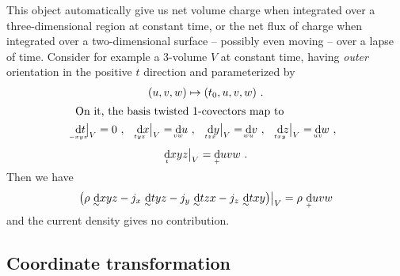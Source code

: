 \documentclass[\ifafour a4paper,12pt,\else a5paper,10pt,\fi%
onecolumn,oneside,article,%
british%
]{memoir}
\theoremstyle{remark}
\theoremstyle{innote}
\newcommand*{\di}{\mathrm{d}}%
\renewcommand*{\|}[1][]{\nonscript\:#1\vert\nonscript\:\mathopen{}}
\newcommand*{\tw}[2][\scriptstyle\sim]{\smash[b]{\underset{\mathclap{{}^{#1}}}{#2}}}
\newcommand*{\ti}[1][\scriptstyle\sim]{\tw[#1]{\di}}
\begin{document}
This object automatically give us net volume charge when integrated over a three-dimensional region at constant time, or the net flux of charge when integrated over a two-dimensional surface -- possibly even moving -- over a lapse of time. Consider for example a 3-volume $V$ at constant time, having \emph{outer} orientation in the positive $t$ direction and parameterized by
\begin{gather}
  \label{eq:3-volume_space}
  (u, v, w) \mapsto (t_{0}, u, v, w) \ .
\\
  \shortintertext{On it, the basis twisted 1-covectors map to}
  \begin{gathered}
  \ti[-xyz] t\bigr\rvert_{V} = 0\ , \quad
  \ti[tyz] x\bigr\rvert_{V} = \ti[vw] u\ , \quad
  \ti[tzx] y\bigr\rvert_{V} = \ti[wu] v\ , \quad
  \ti[txy] z\bigr\rvert_{V} = \ti[uv] w\ ,
  \\[2\jot]
  \ti[t]xyz\bigr\rvert_{V} = \ti[+]uvw \ .
\end{gathered}
\end{gather}
Then we have
\begin{equation}
  \label{eq:charge-current_on_3volume}
  \bigl(\rho\ \ti xyz
  - j_{x}\ \ti tyz - j_{y}\ \ti tzx - j_{z}\ \ti txy \bigr)\bigr\rvert_{V} =
  \rho\ \ti[+] uvw
\end{equation}
and the current density gives no contribution.

\subsection{Coordinate transformation}
\label{sec:charge_coords}
\end{document}
